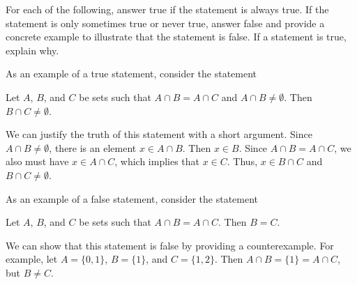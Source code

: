 \begin{comment}
Finally, we show that $\bigcup_{x \in I} B_x = I \cup \{0\}$ by demonstrating the containment in both directions. 
\begin{itemize}
\item To prove that $\bigcup_{x \in I} B_x \subseteq I \cup \{0\}$, let $y \in \bigcup_{x \in I} B_x$. Then $y \in B_x$ for some $x \in I$. That means that $y \in [0,x]$ for some positive real number $x$. So $y$ must be a positive number or 0, or $y \in I$. Thus, $\bigcup_{x \in I} B_x \subseteq I$. 
\item Now we prove that $I \cup \{0\} \subseteq \bigcup_{x \in I} B_x$. Let $y \in I \cup \{0\}$. Then $y$ is a positive real number or $y=0$. If $y=0$, then $y \in [0,1] = B_1$. If $y > 0$, it follows $y \in [0,y] = B_{y}$. Thus, $y \in \bigcup_{x \in I} B_x$ in either case and $I \cup \{0\} \subseteq \bigcup_{x \in I} B_x$. The two containments together demonstrate that $\bigcup_{x \in I} B_x = I \cup \{0\}$.
\end{itemize}

\end{comment}


\item For each of the following, answer true if the statement is always true. If the statement is only sometimes true or never true, answer false and provide a concrete example to illustrate that the statement is false. If a statement is true, explain why. 

As an example of a true statement, consider the statement 
\begin{center} Let $A$, $B$, and $C$ be sets such that $A \cap B = A \cap C$ and $A \cap B \neq \emptyset$. Then $B \cap C \neq \emptyset$. \end{center}
We can justify the truth of this statement with a short argument. Since $A \cap B \neq \emptyset$, there is an element $x \in A \cap B$. Then $x \in B$. Since $A \cap B = A \cap C$, we also must have $x \in A \cap C$, which implies that $x \in C$. Thus, $x \in B \cap C$ and $B \cap C \neq \emptyset$. 

As an example of a false statement, consider the statement 
\begin{center} Let $A$, $B$, and $C$ be sets such that $A \cap B = A \cap C$. Then $B = C$. \end{center}
We can show that this statement is false by providing a counterexample. For example, let $A = \{0,1\}$, $B=\{1\}$, and $C = \{1,2\}$. Then $A \cap B = \{1\} = A \cap C$, but $B \neq C$.

